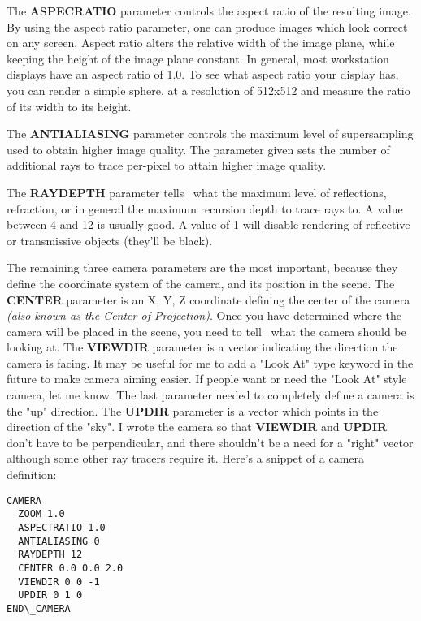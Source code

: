   The {\bf ASPECRATIO} parameter controls the aspect ratio of the resulting
image.  By using the aspect ratio parameter, one can produce images which
look correct on any screen.  Aspect ratio alters the relative width of the
image plane, while keeping the height of the image plane constant.  In 
general, most workstation displays have an aspect ratio of 1.0.  To see
what aspect ratio your display has, you can render a simple sphere, at 
a resolution of 512x512 and measure the ratio of its width to its height. 

The {\bf ANTIALIASING} parameter controls the maximum level of supersampling
used to obtain higher image quality.  The parameter given sets the number of
additional rays to trace per-pixel to attain higher image quality.

  The {\bf RAYDEPTH} parameter tells \RAY\ what the maximum
level of reflections, refraction, or in general the maximum recursion
depth to trace rays to.  A value between 4 and 12 is usually good.  A
value of 1 will disable rendering of reflective or transmissive 
objects (they'll be black). 

  The remaining three camera parameters are the most important, because
they define the coordinate system of the camera, and its position in the
scene.  The {\bf CENTER} parameter is an X, Y, Z coordinate defining the 
center of the camera {\em (also known as the Center of Projection)}.
Once you have determined where the camera will be placed in the scene, you
need to tell \RAY\ what the camera should be looking at.  The
{\bf VIEWDIR} parameter is a vector indicating the direction the camera
is facing.  It may be useful for me to add a "Look At" type keyword in
the future to make camera aiming easier.  If people want or need the
"Look At" style camera, let me know.  The last parameter needed to completely
define a camera is the "up" direction.  The {\bf UPDIR} parameter is a vector
which points in the direction of the "sky".  I wrote the camera so that
{\bf VIEWDIR} and {\bf UPDIR} don't have to be perpendicular, and there
shouldn't be a need for a "right" vector although some other ray tracers 
require it.  Here's a snippet of a camera definition:
\begin{verbatim}
CAMERA
  ZOOM 1.0
  ASPECTRATIO 1.0
  ANTIALIASING 0
  RAYDEPTH 12
  CENTER 0.0 0.0 2.0
  VIEWDIR 0 0 -1 
  UPDIR 0 1 0
END\_CAMERA 
\end{verbatim}


